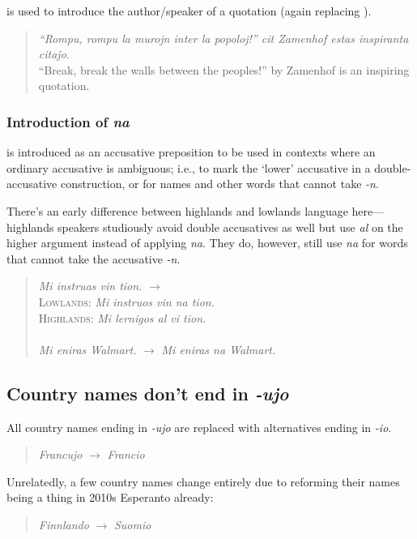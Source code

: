  is used to introduce the author/speaker of a quotation (again replacing ).
\begin{quote}
    \textit{``Rompu, rompu la murojn inter la popoloj!'' cit Zamenhof estas inspiranta citaĵo.}\\
    ``Break, break the walls between the peoples!'' by Zamenhof is an inspiring quotation.
\end{quote}

\subsubsection{Introduction of \textit{na}}

 is introduced as an accusative preposition to be used in contexts where an ordinary accusative is ambiguous; i.e., to mark the `lower' accusative in a double-accusative construction, or for names and other words that cannot take \textit{-n}.

There's an early difference between highlands and lowlands language here---highlands speakers studiously avoid double accusatives as well but use \textit{al} on the higher argument instead of applying \textit{na}. They do, however, still use \textit{na} for words that cannot take the accusative \textit{-n}.
\begin{quote}
    \textit{Mi instruas vin tion.} $\to$\\
    \textsc{Lowlands:} \textit{Mi instruos vin na tion.}\\
    \textsc{Highlands:} \textit{Mi lernigos al vi tion.}\\
    \\
    \textit{Mi eniras Walmart.} $\to$ \textit{Mi eniras na Walmart.}
\end{quote}

\subsection{Country names don't end in \textit{-ujo}}

All country names ending in \textit{-ujo} are replaced with alternatives ending in \textit{-io}. 
\begin{quote}
    \textit{Francujo} $\to$ \textit{Francio}
\end{quote}
Unrelatedly, a few country names change entirely due to reforming their names being a thing in 2010s Esperanto already:
\begin{quote}
    \textit{Finnlando} $\to$ \textit{Suomio}
\end{quote}

